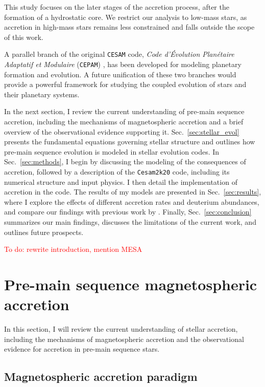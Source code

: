 \documentclass[12pt,a4paper]{article}
\newcommand{\qt}[1]{\textcolor{red}{#1}}
\begin{document}
This study focuses on the later stages of the accretion process, after the formation of a hydrostatic core. We restrict our analysis to low-mass stars, as accretion in high-mass stars remains less constrained and falls outside the scope of this work.

A parallel branch of the original \texttt{CESAM} code, \textit{Code d'Évolution Planétaire Adaptatif et Modulaire} (\texttt{CEPAM}) \parencite{GuillotMorel1995}, has been developed for modeling planetary formation and evolution. A future unification of these two branches would provide a powerful framework for studying the coupled evolution of stars and their planetary systems.

In the next section, I review the current understanding of pre-main sequence accretion, including the mechanisms of magnetospheric accretion and a brief overview of the observational evidence supporting it. Sec.~\ref{sec:stellar_evol} presents the fundamental equations governing stellar structure and outlines how pre-main sequence evolution is modeled in stellar evolution codes. In Sec.~\ref{sec:methods}, I begin by discussing the modeling of the consequences of accretion, followed by a description of the \texttt{Cesam2k20} code, including its numerical structure and input physics. I then detail the implementation of accretion in the code. The results of my models are presented in Sec.~\ref{sec:results}, where I explore the effects of different accretion rates and deuterium abundances, and compare our findings with previous work by \textcite{PallaStahler1993}. Finally, Sec.~\ref{sec:conclusion} summarizes our main findings, discusses the limitations of the current work, and outlines future prospects.

\qt{To do: rewrite introduction, mention MESA}
\section{Pre-main sequence magnetospheric accretion}
\label{sec:background}

In this section, I will review the current understanding of stellar accretion, including the mechanisms of magnetospheric accretion and the observational evidence for accretion in pre-main sequence stars. 

\subsection{Magnetospheric accretion paradigm}
\label{sec:magnetospheric_accretion}
\end{document}
